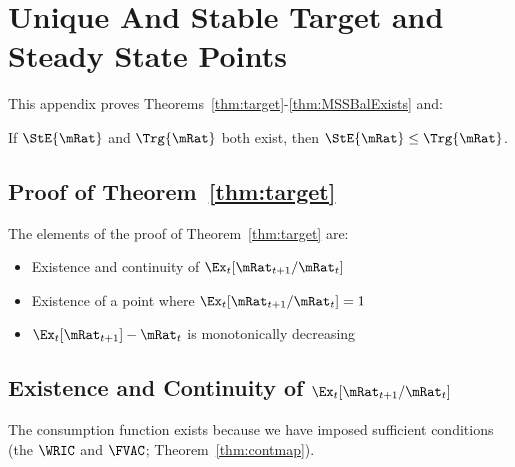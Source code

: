 \documentclass[\econtexRoot/BufferStockTheory]{subfiles}
\begin{document}

\hypertarget{ApndxMTargetIsStable}{}
\section{Unique And Stable Target and Steady State Points}\label{sec:ApndxMTargetIsStable}


This appendix proves Theorems~\ref{thm:target}-\ref{thm:MSSBalExists} and:
\onlyinsubfile{\setcounter{theorem}{1}}

  \begin{lemma}\label{lemma:orderingPartOne}
  If $\StE{\mRat}$ and $\Trg{\mRat}$ both exist, then $\StE{\mRat} \leq \Trg{\mRat}$.
  \end{lemma}

  \begin{comment}
  \begin{lemma}\label{lemma:orderingPartTwo}
  If $\StE{\mRat}$ and $\Gro{\mRat}$ both exist, then $\StE{\mRat} \leq \Gro{\mRat}$.
  \end{lemma}
\end{comment}

  \subsection{Proof of Theorem~\ref{thm:target}}
  
  The elements of the proof of Theorem~\ref{thm:target} are:
\begin{itemize}
\item Existence and continuity of $\Ex_t [{\mRat}_{t+1}/\mRat_t]$
\item Existence of a point where $\Ex_t [{\mRat}_{t+1}/\mRat_t] = 1$
\item $\Ex_t [{\mRat}_{t+1}]-\mRat_{t}$ is monotonically decreasing
\end{itemize}


\subsection{Existence and Continuity of
  \texorpdfstring{$\Ex_t [{\mRat}_{t+1}/\mRat_t]$}{Ex-{t}[mRat-{t+1}/mRat-{t}]}}\label{subsubsec:RatExitsCont}
The consumption function exists because we have imposed sufficient conditions (the $\WRIC$ and $\FVAC$; Theorem~\ref{thm:contmap}). %
\end{document}
